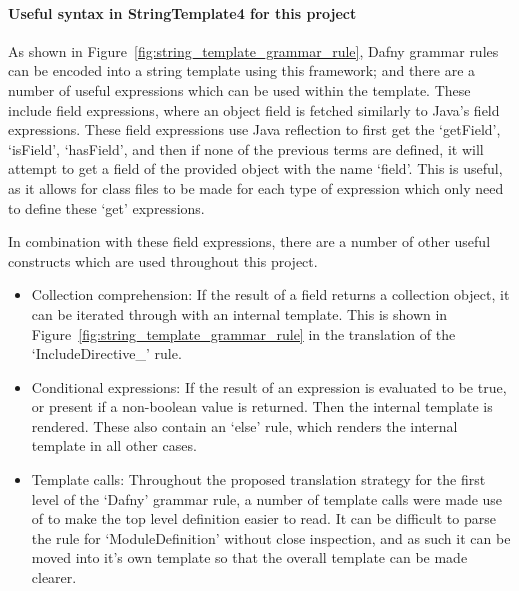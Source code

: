 \documentclass{entcs}
\newcommand{\lfcomment}[1]{\ifthenelse { \boolean{showComments} } {\textcolor{red}{LF:~#1}} { } } %
\begin{document}





\paragraph{Useful syntax in StringTemplate4 for this project}
As shown in Figure~\ref{fig:string_template_grammar_rule}, Dafny grammar rules can be encoded into a string template using this framework; and there are a number of useful expressions which can be used within the template. These include field expressions, where an object field is fetched similarly to Java's field expressions. These field expressions use Java reflection to first get the `getField', `isField', `hasField', and then if none of the previous terms are defined, it will attempt to get a field of the provided object with the name `field'. This is useful, as it allows for class files to be made for each type of expression which only need to define these `get' expressions.

In combination with these field expressions, there are a number of other useful constructs which are used throughout this project.

\begin{itemize}
    \item Collection comprehension: If the result of a field returns a collection object, it can be iterated through with an internal template. This is shown in Figure~\ref{fig:string_template_grammar_rule} in the translation of the `IncludeDirective\_' rule.
    \item Conditional expressions: If the result of an expression is evaluated to be true, or present if a non-boolean value is returned. Then the internal template is rendered. These also contain an `else' rule, which renders the internal template in all other cases.
    \item Template calls: Throughout the proposed translation strategy for the first level of the `Dafny' grammar rule, a number of template calls were made use of to make the top level definition easier to read. It can be difficult to parse the rule for `ModuleDefinition' without close inspection, and as such it can be moved into it's own template so that the overall template can be made clearer.
\end{itemize}
\end{document}
